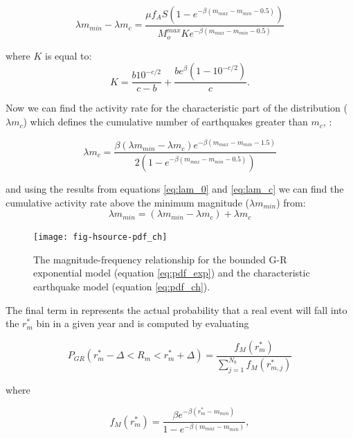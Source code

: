 \begin{enumerate}
\begin{equation} \label{eq:lam_0}
\lambda m_{min} - \lambda m_{c} = \frac { \mu f_A S (1-e ^{- \beta (m_{max} - m_{min} - 0.5)}) } { M_o^{max} K e ^{- \beta (m_{max} - m_{min} - 0.5)  }  }
\end{equation}

where $K$ is equal to:
\begin{equation}
K = \frac { b 10 ^ {-c/2} }  { c- b } + \frac { b e ^{\beta} (1 - 10^{-c/2})  }  {  c } .
\end{equation}

Now we can find  the activity rate for the characteristic part of the distribution ($\lambda m_{c}$) which defines the cumulative number of earthquakes greater than $m_c$,  :

\begin{equation} \label{eq:lam_c}
\lambda m_c = \frac { \beta (\lambda m_{min} - \lambda m_{c}) e ^{-\beta ( m_{max} - m_{min} - 1.5)} }  { 2 ( 1 -  e ^{- \beta (m_{max} - m_{min} - 0.5)  }) }
\end{equation}

and using the results from equations \ref{eq:lam_0} and \ref{eq:lam_c} we can find the cumulative activity rate above the minimum magnitude ($\lambda m_{min}$) from:
\begin{equation} \label{eq:lam_ch}
\lambda m_{min} = (\lambda m_{min} - \lambda m_{c}) + \lambda m_{c}
\end{equation}

\begin{figure}[htp]
\centerline{\texttt{[image: fig-hsource-pdf\_ch]}}
\caption{The magnitude-frequency relationship for the bounded G-R exponential model (equation \ref{eq:pdf_exp}) and the characteristic earthquake model (equation \ref{eq:pdf_ch}).}
\label{fig:pdf}
\end{figure}

The final term in 
represents the actual probability that a real event will fall into
the $r_m^*$ bin in a given year and is computed by evaluating

\begin{equation}
P_{GR}(r_m^*-\Delta<R_m<r_m^*+\Delta) =
\frac{f_M(r_m^*)}{\sum\limits_{j=1}^{N_b} f_M(r_{m,j}^*)}
\end{equation}

where

\begin{equation}
f_M(r_m^*) = \frac{\beta
e^{-\beta(r_m^*-m_{min})}}{1-e^{-\beta(m_{max}-m_{min})}},
\end{equation}


\end{enumerate}

